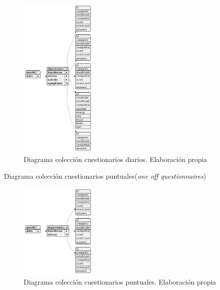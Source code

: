 \begin{figure}[h]
    \centering
    \includegraphics[width=0.33\textwidth]{figures/bd/Servidor daily questionnaires.png}
    \caption[Diagrama colección cuestionarios diarios]{Diagrama colección cuestionarios diarios. Elaboración propia}
    \label{figure:disenio:diagrama_daily}
\end{figure}

Diagrama colección cuestionarios puntuales(\textit{one off questionnaires})

\begin{figure}[h]
    \centering
    \includegraphics[width=0.33\textwidth]{figures/bd/Servidor one off questionnaires.png}
    \caption[Diagrama colección cuestionarios puntuales]{Diagrama colección cuestionarios puntuales. Elaboración propia}
    \label{figure:disenio:diagrama_one_off}
\end{figure}

